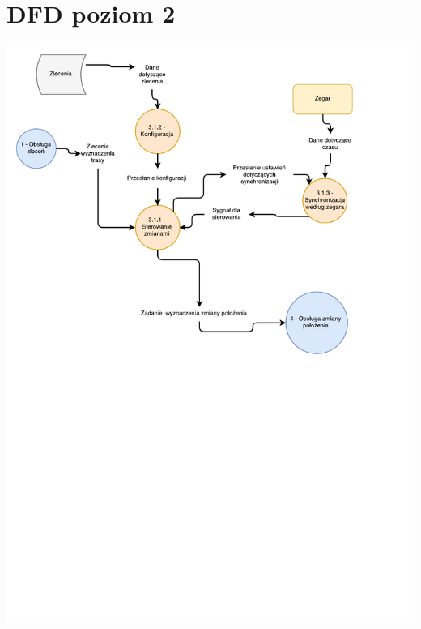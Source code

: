 \documentclass[11pt]{article}
\begin{document}
	\section{DFD poziom 2}
	\begin{center}
		\includegraphics[scale=0.8]{DFD31.pdf}
	\end{center}
	\newpage
\end{document}
